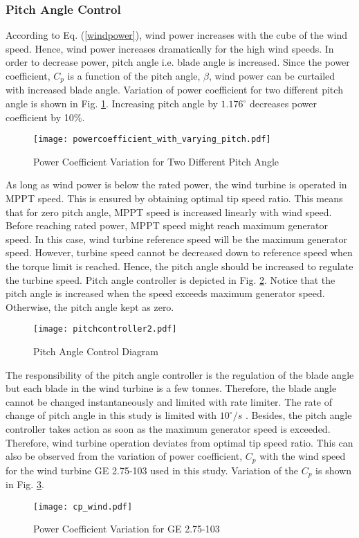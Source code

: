\subsubsection{Pitch Angle Control}
According to Eq. (\ref{windpower}), wind power increases with the cube of the wind speed. Hence, wind power increases dramatically for the high wind speeds. In order to decrease power, pitch angle i.e. blade angle is increased. Since the power coefficient, $C_{p}$ is a function of the pitch angle, $\beta$, wind power can be curtailed with increased blade angle. Variation of power coefficient for two different pitch angle is shown in Fig. \ref{cpwithtwopitchangle}. Increasing pitch angle by $1.176^{\circ}$ decreases power coefficient by 10\%.\par
\begin{figure}[h!]
	\centering
	\texttt{[image: powercoefficient\_with\_varying\_pitch.pdf]}
	\caption{Power Coefficient Variation for Two Different Pitch Angle}
	\label{cpwithtwopitchangle}
\end{figure} 
As long as wind power is below the rated power, the wind turbine is operated in MPPT speed. This is ensured by obtaining optimal tip speed ratio. This means that for zero pitch angle, MPPT speed is increased linearly with wind speed. Before reaching rated power, MPPT speed might reach maximum generator speed. In this case, wind turbine reference speed will be the maximum generator speed. However, turbine speed cannot be decreased down to reference speed when the torque limit is reached. Hence, the pitch angle should be increased to regulate the turbine speed. Pitch angle controller is depicted in Fig. \ref{pitchcontroller}. Notice that the pitch angle is increased when the speed exceeds maximum generator speed. Otherwise, the pitch angle kept as zero.\par
\begin{figure}[h]
	\centering
	\texttt{[image: pitchcontroller2.pdf]}
	\caption{Pitch Angle Control Diagram}
	\label{pitchcontroller}
\end{figure}
The responsibility of the pitch angle controller is the regulation of the blade angle but each blade in the wind turbine is a few tonnes. Therefore, the blade angle cannot be changed instantaneously and limited with rate limiter. The rate of change of pitch angle in this study is limited with $10^{\circ}/s$ \cite{Ackermann2005a}. Besides, the pitch angle controller takes action as soon as the maximum generator speed is exceeded. Therefore, wind turbine operation deviates from optimal tip speed ratio. This can also be observed from the variation of power coefficient, $C_{p}$ with the wind speed for the wind turbine GE 2.75-103 used in this study. Variation of the $C_{p}$ is shown in Fig. \ref{powercoefficientge}.
\begin{figure}[h!]
	\centering
	\texttt{[image: cp\_wind.pdf]}
	\caption{Power Coefficient Variation for GE 2.75-103}
	\label{powercoefficientge}
\end{figure}
